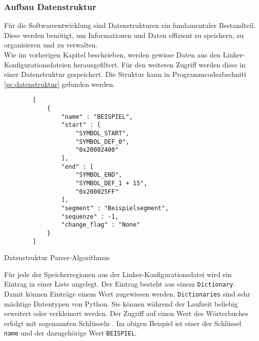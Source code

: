 \subsubsection{Aufbau Datenstruktur}\label{kap:aufbau_datenstruktur}
Für die Softwareentwicklung sind Datenstrukturen ein fundamentaler Bestandteil.
Diese werden benötigt, um Informationen und Daten effizient zu speichern, zu organisieren und zu verwalten. \\

Wie im vorherigen Kapitel beschrieben, werden gewisse Daten aus den Linker-Konfigurationsdateien herausgefiltert.
Für den weiteren Zugriff werden diese in einer Datenstruktur gespeichert. 
Die Struktur kann in Programmcodeabschnitt \ref{pc:datenstruktur} gefunden werden.\\

\begin{listing}[H]
	\begin{verbatim}
		[
			{
				"name" : "BEISPIEL",
				"start" : [
					"SYMBOL_START", 
					"SYMBOL_DEF_0", 
					"0x20002400"
				],
				"end" : [
					"SYMBOL_END",
					"SYMBOL_DEF_1 + 15", 
					"0x200025FF"
				],
				"segment" : "Beispielsegment",
				"sequenze" : -1,
				"change_flag" : "None"
			}
		]
	\end{verbatim}
	\caption{Datenstruktur Parser-Algorithmus}
	\label{pc:datenstruktur}
\end{listing}

Für jede der Speicherregionen aus der Linker-Konfigurationsdatei wird ein Eintrag in einer Liste angelegt.
Der Eintrag besteht aus einem \verb*|Dictionary|.
Damit können Einträge einem Wert zugewiesen werden.
\verb*|Dictionaries| sind sehr mächtige Datentypen von Python.
Sie können während der Laufzeit beliebig erweitert oder verkleinert werden.
Der Zugriff auf einen Wert des Wörterbuches erfolgt mit sogenannten Schlüsseln \cite{Klein2021-ko}.
Im obigen Beispiel ist einer der Schlüssel \verb*|name| und der dazugehörige Wert \verb*|BEISPIEL|. \\

